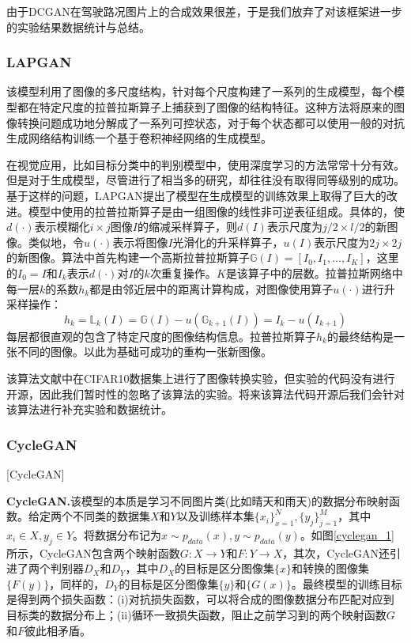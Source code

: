 由于DCGAN在驾驶路况图片上的合成效果很差，于是我们放弃了对该框架进一步的实验结果数据统计与总结。

\subsubsection{LAPGAN}

 该模型利用了图像的多尺度结构，针对每个尺度构建了一系列的生成模型，每个模型都在特定尺度的拉普拉斯算子\cite{lapcode}上捕获到了图像的结构特征。这种方法将原来的图像转换问题成功地分解成了一系列可控状态，对于每个状态都可以使用一般的对抗生成网络结构训练一个基于卷积神经网络的生成模型。

在视觉应用，比如目标分类中的判别模型中，使用深度学习的方法常常十分有效。但是对于生成模型，尽管进行了相当多的研究\cite{lapgan1}\cite{lapgan2}\cite{lapgan3}，却往往没有取得同等级别的成功。基于这样的问题，LAPGAN提出了模型在生成模型的训练效果上取得了巨大的改进。模型中使用的拉普拉斯算子是由一组图像的线性非可逆表征组成。具体的，使$d(\cdot)$表示模糊化$i\times j$图像$I$的缩减采样算子，则$d(I)$表示尺度为$j/2\times l/2$的新图像。类似地，令$u(\cdot)$表示将图像$I$光滑化的升采样算子，$u(I)$表示尺度为$2j\times 2j$的新图像。算法中首先构建一个高斯拉普拉斯算子$\mathbb{G}(I)=[I_0,I_1,\dots,I_K]$，这里的$I_0=I$和$I_k$表示$d(\cdot)$对$I$的$k$次重复操作。$K$是该算子中的层数。拉普拉斯网络中每一层$k$的系数$h_k$都是由邻近层中的距离计算构成，对图像使用算子$u(\cdot)$进行升采样操作：
$$h_k=\mathbb{L}_k(I)=\mathbb{G}(I)-u(\mathbb{G}_{k+1}(I))=I_k-u(I_{k+1})$$
每层都很直观的包含了特定尺度的图像结构信息。拉普拉斯算子$h_k$的最终结构是一张不同的图像。以此为基础可成功的重构一张新图像。

该算法文献\cite{LAPGAN}中在CIFAR10数据集上进行了图像转换实验，但实验的代码没有进行开源，因此我们暂时性的忽略了该算法的实验。将来该算法代码开源后我们会针对该算法进行补充实验和数据统计。 


\subsubsection{CycleGAN}[CycleGAN]

\textbf{CycleGAN.}\cite{CycleGAN}\quad 该模型的本质是学习不同图片类(比如晴天和雨天)的数据分布映射函数。给定两个不同类的数据集$X$和$Y$以及训练样本集$\{x_i\}_{x=1}^N, \{y_j\}_{j=1}^M$，其中$x_i\in X, y_j\in Y$。将数据分布记为$x\sim p_{data}(x), y\sim p_{data}(y)$。如图\ref{cyclegan_1}所示，CycleGAN包含两个映射函数$G: X\to Y$和$F: Y\to X$，其次，CycleGAN还引进了两个判别器$D_X$和$D_Y$，其中$D_X$的目标是区分图像集$\{x\}$和转换的图像集$\{F(y)\}$，同样的，$D_Y$的目标是区分图像集$\{y\}$和$\{G(x)\}$。最终模型的训练目标是得到两个损失函数：(i)对抗损失函数，可以将合成的图像数据分布匹配对应到目标类的数据分布上；(ii)循环一致损失函数，阻止之前学习到的两个映射函数$G$和$F$彼此相矛盾。

